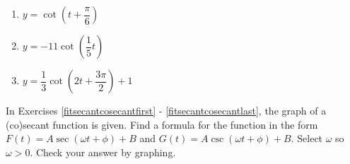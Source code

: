 \begin{multicols}{3}

\begin{enumerate}

\setcounter{enumi}{\value{HW}}

\item $y = \cot \left( t + \dfrac{\pi}{6} \right)$  
\item $y = -11\cot \left( \dfrac{1}{5} t \right)$
\item $y = \dfrac{1}{3} \cot \left( 2t + \dfrac{3\pi}{2} \right) + 1$ \label{othergraphslast}

\setcounter{HW}{\value{enumi}}

\end{enumerate}

\end{multicols}

In Exercises \ref{fitsecantcosecantfirst} - \ref{fitsecantcosecantlast},  the graph of a (co)secant function is given. Find a formula for the function in the form $F(t) = A \sec(\omega t + \phi) + B$ and $G(t) = A \csc(\omega t + \phi) + B$.  Select $\omega$ so  $\omega > 0$. Check your answer by graphing.

